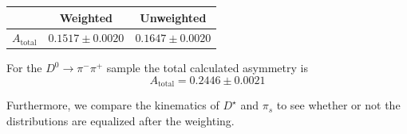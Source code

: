\documentclass{article}
\begin{document}
    \begin{center}
        \begin{tabular}{c|c|c}
             & Weighted & Unweighted\\
             \hline\hline
            $A_{\text{total}}$ & $0.1517 \pm 0.0020$ & $0.1647 \pm 0.0020$\\
        \end{tabular}
    \end{center}

    For the $D^0\to \pi^-\pi^+$ sample the total calculated asymmetry is
    \begin{equation}
        A_{\text{total}} = 0.2446 \pm 0.0021
    \end{equation}

    Furthermore, we compare the kinematics of $D^\star$ and $\pi_s$ to see whether or not the distributions are equalized after the weighting.
\end{document}
